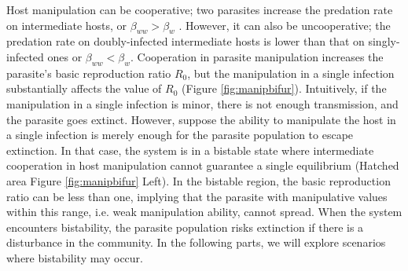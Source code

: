 \documentclass[a4paper]{scrartcl}
\begin{document}
Host manipulation can be cooperative; two parasites increase the predation rate on intermediate hosts, or $\beta_{ww} > \beta_w$ . 
However, it can also be uncooperative; the predation rate on doubly-infected intermediate hosts is lower than that on singly-infected ones or $\beta_{ww} < \beta_w$.
Cooperation in parasite manipulation increases the parasite's basic reproduction ratio $R_0$, but the manipulation in a single infection substantially affects the value of $R_0$ (Figure \ref{fig:manipbifur}). 
Intuitively, if the manipulation in a single infection is minor, there is not enough transmission, and the parasite goes extinct.
However, suppose the ability to manipulate the host in a single infection is merely enough for the parasite population to escape extinction. 
In that case, the system is in a bistable state where intermediate cooperation in host manipulation cannot guarantee a single equilibrium (Hatched area Figure \ref{fig:manipbifur} Left). 
In the bistable region, the basic reproduction ratio can be less than one, implying that the parasite with manipulative values within this range, i.e. weak manipulation ability, cannot spread. 
When the system encounters bistability, the parasite population risks extinction if there is a disturbance in the community.
In the following parts, we will explore scenarios where bistability may occur. 
\end{document}
